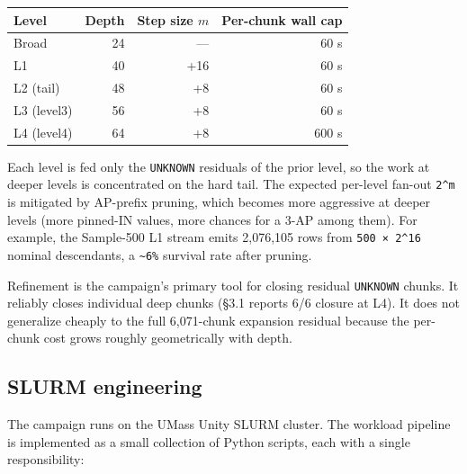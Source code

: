 {\def\LTcaptype{none} %
\begin{longtable}[]{@{}lrrr@{}}
\toprule\noalign{}
Level & Depth & Step size $m$ & Per-chunk wall cap \\
\midrule\noalign{}
\endhead
\bottomrule\noalign{}
\endlastfoot
Broad & 24 & --- & 60 s \\
L1 & 40 & +16 & 60 s \\
L2 (tail) & 48 & +8 & 60 s \\
L3 (level3) & 56 & +8 & 60 s \\
L4 (level4) & 64 & +8 & 600 s \\
\end{longtable}
}

Each level is fed only the \texttt{UNKNOWN} residuals of the prior level,
so the work at deeper levels is concentrated on the hard tail. The
expected per-level fan-out \texttt{2\^{}m} is mitigated by AP-prefix pruning,
which becomes more aggressive at deeper levels (more pinned-IN
values, more chances for a 3-AP among them). For example, the
Sample-500 L1 stream emits 2,076,105 rows from \texttt{500\ ×\ 2\^{}16}
nominal descendants, a \texttt{\textasciitilde{}6\%} survival rate after pruning.

Refinement is the campaign's primary tool for closing residual
\texttt{UNKNOWN} chunks. It reliably closes individual deep chunks
(§3.1 reports 6/6 closure at L4). It does not generalize
cheaply to the full 6,071-chunk expansion residual because the
per-chunk cost grows roughly geometrically with depth.

\subsection{SLURM engineering}\label{slurm-engineering}

The campaign runs on the UMass Unity SLURM cluster. The workload
pipeline is implemented as a small collection of Python scripts,
each with a single responsibility:

